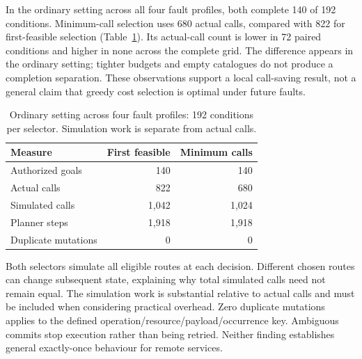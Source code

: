 In the ordinary setting across all four fault profiles, both complete 140 of
192 conditions. Minimum-call selection uses 680 actual calls, compared with 822
for first-feasible selection (Table~\ref{tab:recovery-cost}). Its actual-call
count is lower in 72 paired conditions and higher in none across the complete
grid. The difference appears in the ordinary setting; tighter budgets and empty
catalogues do not produce a completion separation. These observations support a
local call-saving result, not a general claim that greedy cost selection is
optimal under future faults.

\begin{table}[t]
\caption{Ordinary setting across four fault profiles: 192 conditions per
selector. Simulation work is separate from actual calls.}
\label{tab:recovery-cost}
\centering\small
\setlength{\tabcolsep}{3pt}
\begin{tabular}{lrr}
\hline
Measure & First feasible & Minimum calls \\
\hline
Authorized goals & 140 & 140 \\
Actual calls & 822 & 680 \\
Simulated calls & 1,042 & 1,024 \\
Planner steps & 1,918 & 1,918 \\
Duplicate mutations & 0 & 0 \\
\hline
\end{tabular}
\end{table}

Both selectors simulate all eligible routes at each decision. Different chosen
routes can change subsequent state, explaining why total simulated calls need
not remain equal. The simulation work is substantial relative to actual calls
and must be included when considering practical overhead. Zero duplicate
mutations applies to the defined operation/resource/payload/occurrence key.
Ambiguous commits stop execution rather than being retried. Neither finding
establishes general exactly-once behaviour for remote services.

